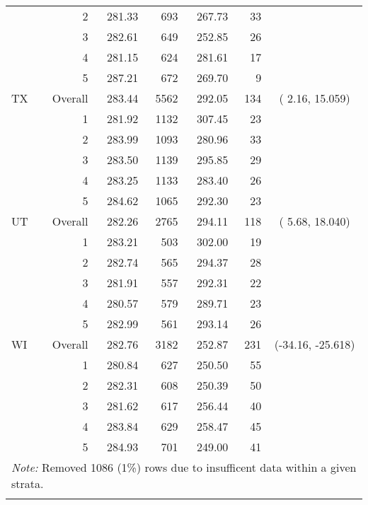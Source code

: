 \begin{longtable}{lrrr@{\extracolsep{.25cm}}rrc}
   & 2 & 281.33 & 693 & 267.73 &  33 &  \\ 
   & 3 & 282.61 & 649 & 252.85 &  26 &  \\ 
   & 4 & 281.15 & 624 & 281.61 &  17 &  \\ 
   & 5 & 287.21 & 672 & 269.70 &   9 &  \\ 
   \hline
TX & Overall & 283.44 & 5562 & 292.05 & 134 & (  2.16,  15.059) \\ 
   & 1 & 281.92 & 1132 & 307.45 &  23 &  \\ 
   & 2 & 283.99 & 1093 & 280.96 &  33 &  \\ 
   & 3 & 283.50 & 1139 & 295.85 &  29 &  \\ 
   & 4 & 283.25 & 1133 & 283.40 &  26 &  \\ 
   & 5 & 284.62 & 1065 & 292.30 &  23 &  \\ 
   \hline
UT & Overall & 282.26 & 2765 & 294.11 & 118 & (  5.68,  18.040) \\ 
   & 1 & 283.21 & 503 & 302.00 &  19 &  \\ 
   & 2 & 282.74 & 565 & 294.37 &  28 &  \\ 
   & 3 & 281.91 & 557 & 292.31 &  22 &  \\ 
   & 4 & 280.57 & 579 & 289.71 &  23 &  \\ 
   & 5 & 282.99 & 561 & 293.14 &  26 &  \\ 
   \hline
WI & Overall & 282.76 & 3182 & 252.87 & 231 & (-34.16, -25.618) \\ 
   & 1 & 280.84 & 627 & 250.50 &  55 &  \\ 
   & 2 & 282.31 & 608 & 250.39 &  50 &  \\ 
   & 3 & 281.62 & 617 & 256.44 &  40 &  \\ 
   & 4 & 283.84 & 629 & 258.47 &  45 &  \\ 
   & 5 & 284.93 & 701 & 249.00 &  41 &  \\ 
   \hline \multicolumn{7}{l}{\textit{Note:} Removed 1086 (1\%) rows due to insufficent data within a given strata.} \\\hline
\label{g8math-mlpsa-lr}
\end{longtable}
